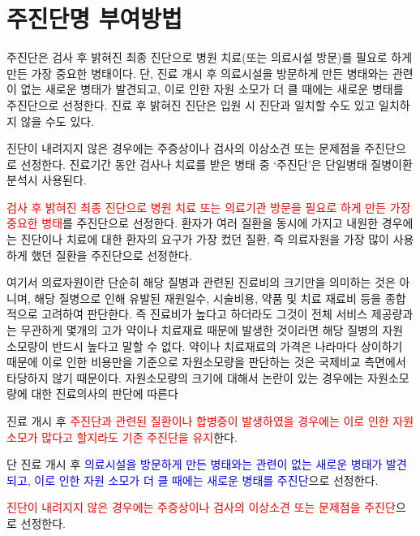\section{주진단명 부여방법}
\par
\medskip
주진단은 검사 후 밝혀진 최종 진단으로 병원 치료(또는 의료시설 방문)를 필요로 하게 만든 가장 중요한 병태이다. 단, 진료 개시 후 의료시설을 방문하게 만든 병태와는 관련이 없는 새로운 병태가 발견되고, 이로 인한 자원 소모가 더 클 때에는 새로운 병태를 주진단으로  선정한다. 진료 후 밝혀진 진단은 입원 시 진단과 일치할 수도 있고 일치하지 않을 수도 있다. \par
진단이 내려지지 않은 경우에는 주증상이나 검사의 이상소견 또는 문제점을 주진단으로 선정한다. 진료기간 동안 검사나 치료를 받은 병태 중 ‘주진단’은 단일병태 질병이환 분석시 사용된다.
\prezi{\clearpage}
\par
\medskip
\textcolor{red}{검사 후 밝혀진 최종 진단으로 병원 치료 또는 의료기관 방문을 필요로 하게 만든 가장 중요한 병태}를 주진단으로 선정한다.
환자가 여러 질환을 동시에 가지고 내원한 경우에는 진단이나 치료에 대한 환자의 요구가 가장 컸던 질환, 즉 의료자원을 가장 많이 사용하게 했던 질환을 주진단으로 선정한다.\par
여기서 의료자원이란 단순히 해당 질병과 관련된 진료비의 크기만을 의미하는 것은 아니며, 해당 질병으로 인해 유발된 재원일수, 시술비용, 약품 및 치료 재료비 등을 종합적으로 고려하여 판단한다. 즉 진료비가 높다고 하더라도 그것이 전체 서비스 제공량과는 무관하게 몇개의 고가 약이나 치료재료 때문에 발생한 것이라면 해당 질병의 자원 소모량이 반드시 높다고 말할 수 없다. 약이나 치료재료의 가격은 나라마다 상이하기 때문에 이로 인한 비용만을 기준으로 자원소모량을 판단하는 것은 국제비교 측면에서 타당하지 않기 때문이다. 자원소모량의 크기에 대해서 논란이 있는 경우에는 자원소모량에 대한 진료의사의 판단에 따른다\par
진료 개시 후 \textcolor{red}{주진단과 관련된 질환이나 합병증이 발생하였을 경우에는 이로 인한 자원소모가 많다고 할지라도 기존 주진단을 유지}한다.\par
단 진료 개시 후 \textcolor{blue}{의료시설을 방문하게 만든 병태와는 관련이 없는 새로운 병태가 발견되고, 이로 인한 자원 소모가 더 클 때에는 새로운 병태를 주진단}으로 선정한다.\par
\textcolor{red}{진단이 내려지지 않은 경우에는 주증상이나 검사의 이상소견 또는 문제점을 주진단}으로 선정한다.\par
\prezi{\clearpage}

